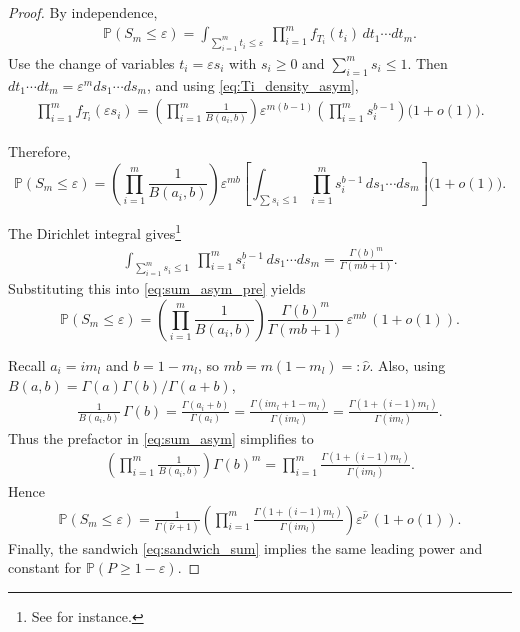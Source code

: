 \documentclass{article}
\theoremstyle{remark} %
\begin{document}
\begin{proof}
By independence,
\begin{align}
\mathbb P(S_m\le \varepsilon)
=\int_{\sum_{i=1}^m t_i\le \varepsilon}\ \prod_{i=1}^m f_{T_i}(t_i)\,dt_1\cdots dt_m.
\end{align}
Use the change of variables $t_i=\varepsilon s_i$ with $s_i\ge 0$ and $\sum_{i=1}^m s_i\le 1$.
Then $dt_1\cdots dt_m=\varepsilon^m ds_1\cdots ds_m$, and using \eqref{eq:Ti_density_asym},
\begin{align}
\prod_{i=1}^m f_{T_i}(\varepsilon s_i)
=
\left(\prod_{i=1}^m \frac{1}{B(a_i,b)}\right)
\varepsilon^{m(b-1)}\left(\prod_{i=1}^m s_i^{b-1}\right)\big(1+o(1)\big).
\end{align}


Therefore,
\begin{equation}
\mathbb P(S_m\le \varepsilon)
=
\left(\prod_{i=1}^m \frac{1}{B(a_i,b)}\right)
\varepsilon^{mb}
\left[\int_{\sum s_i\le 1}\prod_{i=1}^m s_i^{b-1}\,ds_1\cdots ds_m\right]
\big(1+o(1)\big).
\label{eq:sum_asym_pre}
\end{equation}


The Dirichlet integral gives\footnote{See \cite{OLKIN1979155} for instance.}
\begin{align}
\int_{\sum_{i=1}^m s_i\le 1}\ \prod_{i=1}^m s_i^{b-1}\,ds_1\cdots ds_m
=
\frac{\Gamma(b)^m}{\Gamma(mb+1)}.
\end{align}
Substituting this into \eqref{eq:sum_asym_pre} yields
\begin{equation}
\mathbb P(S_m\le \varepsilon)
=
\left(\prod_{i=1}^m \frac{1}{B(a_i,b)}\right)
\frac{\Gamma(b)^m}{\Gamma(mb+1)}\,
\varepsilon^{mb}\,(1+o(1)).
\label{eq:sum_asym}
\end{equation}


Recall $a_i=i m_l$ and $b=1-m_l$, so $mb=m(1-m_l)=:\hat\nu$.
Also, using $B(a,b)=\Gamma(a)\Gamma(b)/\Gamma(a+b)$,
\begin{align}
\frac{1}{B(a_i,b)}\,\Gamma(b)
=
\frac{\Gamma(a_i+b)}{\Gamma(a_i)}
=
\frac{\Gamma(i m_l + 1-m_l)}{\Gamma(i m_l)}
=
\frac{\Gamma(1+(i-1)m_l)}{\Gamma(i m_l)}.
\end{align}
Thus the prefactor in \eqref{eq:sum_asym} simplifies to
\begin{align}
\left(\prod_{i=1}^m \frac{1}{B(a_i,b)}\right)\Gamma(b)^m
=
\prod_{i=1}^{m}\frac{\Gamma(1+(i-1)m_l)}{\Gamma(i m_l)}.
\end{align}
Hence
\begin{align}
\mathbb P(S_m\le \varepsilon)
=
\frac{1}{\Gamma(\hat\nu+1)}
\left(\prod_{i=1}^{m}\frac{\Gamma(1+(i-1)m_l)}{\Gamma(i m_l)}\right)
\varepsilon^{\hat\nu}\,(1+o(1)).
\end{align}
Finally, the sandwich \eqref{eq:sandwich_sum} implies the same leading power and constant for
$\mathbb P(P\ge 1-\varepsilon)$.
\end{proof}
\end{document}

